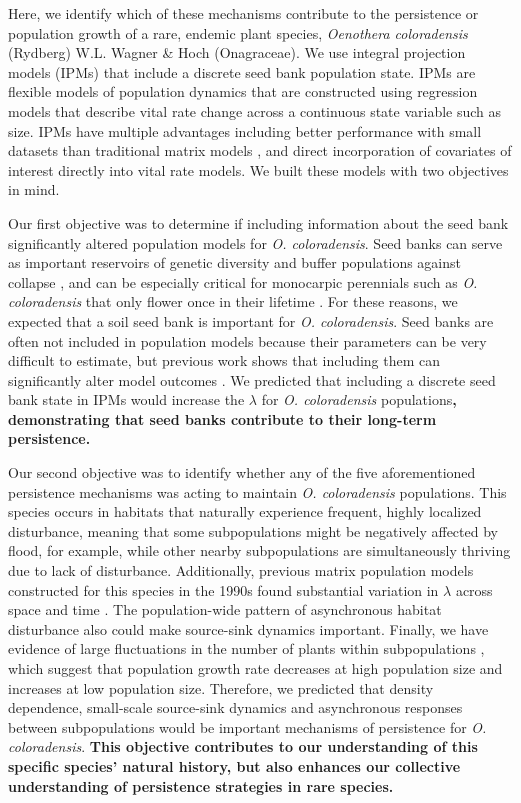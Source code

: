 \documentclass[12pt, letterpaper]{article}
\begin{document}
Here, we identify which of these mechanisms contribute to the persistence or population growth of a rare, endemic plant species, \textit{Oenothera coloradensis} (Rydberg) W.L. Wagner \& Hoch (Onagraceae). We use integral projection models (IPMs) \cite{Easterling2000} that include a discrete seed bank population state. IPMs are flexible models of population dynamics that are constructed using regression models that describe vital rate change across a continuous state variable such as size. IPMs have multiple advantages including better performance with small datasets than traditional matrix models \cite{Ramula2009IntegralHerbs}, and direct incorporation of covariates of interest directly into vital rate models. We built these models with two objectives in mind.

Our first objective was to determine if including information about the seed bank significantly altered population models for \textit{O. coloradensis}. Seed banks can serve as important reservoirs of genetic diversity and buffer populations against collapse \cite{Vitalis2004WhenPerenniality, Jongejans2006WhatRange}, and can be especially critical for monocarpic perennials such as \textit{O. coloradensis} that only flower once in their lifetime \cite{Rees2006}. For these reasons, we expected that a soil seed bank is important for \textit{O. coloradensis}. Seed banks are often not included in population models because their parameters can be very difficult to estimate, but previous work shows that including them can significantly alter model outcomes \cite{Paniw2017, Nguyen2019ConsequencesModels}. We predicted that including a discrete seed bank state in IPMs would increase the $\lambda$ for \textit{O. coloradensis} populations\textbf{, demonstrating that seed banks contribute to their long-term persistence.} 

Our second objective was to identify whether any of the five aforementioned persistence mechanisms was acting to maintain \textit{O. coloradensis} populations. This species occurs in habitats that naturally experience frequent, highly localized disturbance, meaning that some subpopulations might be negatively affected by flood, for example, while other nearby subpopulations are simultaneously thriving due to lack of disturbance. Additionally, previous matrix population models constructed for this species in the 1990s found substantial variation in $\lambda$ across space and time \cite{Floyd1998}. The population-wide pattern of asynchronous habitat disturbance also could make source-sink dynamics important. Finally, we have evidence of large fluctuations in the number of plants within subpopulations \cite{Heidel202133-YearWyoming}, which suggest that population growth rate decreases at high population size and increases at low population size. Therefore, we predicted that density dependence, small-scale source-sink dynamics and asynchronous responses between subpopulations would be important mechanisms of persistence for \textit{O. coloradensis}. \textbf{This objective contributes to our understanding of this specific species' natural history, but also enhances our collective understanding of persistence strategies in rare species. } 
\end{document}
